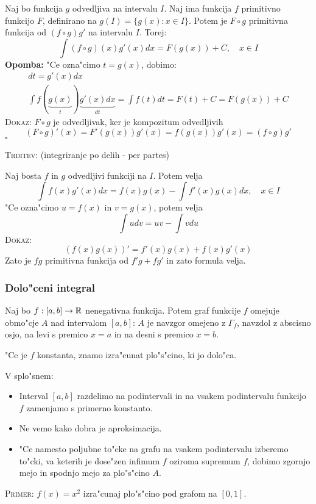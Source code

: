 Naj bo funkcija $g$ odvedljiva na intervalu $I$. Naj ima funkcija $f$ primitivno funkcijo $F$, definirano na $g(I) = \{g(x): x \in I\}$. Potem je $F \circ g$ primitivna funkcija od $(f\circ g) g'$ na intervalu $I$. Torej:
\begin{equation*}
\int (f\circ g)(x) g'(x) dx = F(g(x)) + C, \quad x \in I
\end{equation*}
\textbf{Opomba:} "Ce ozna"cimo $t = g(x)$, dobimo:
\begin{gather*}
dt = g'(x) dx \\
\int f(\underbrace{g(x)}_t) \underbrace{g'(x)dx}_{dt} = \int f(t) dt = F(t) + C = F(g(x)) + C
\end{gather*}
\textsc{Dokaz:} $F \circ g$ je odvedljivak, ker je  kompozitum odvedljivih
\begin{equation*}
(F \circ g)' (x) = F'(g(x)) g'(x) = f(g(x)) g'(x) = (f \circ g) g'
\end{equation*}
\hfill $\square$

\textsc{Trditev:} (integriranje po delih - per partes)

Naj bosta $f$ in $g$ odvedljivi funkciji na $I$. Potem velja
\begin{equation*}
\int f(x) g'(x) dx = f(x) g(x) - \int f'(x) g(x) dx, \quad x \in I
\end{equation*}
"Ce ozna"cimo $u = f(x)$ in $v = g(x)$, potem velja
\begin{equation*}
\int u dv = uv - \int v du
\end{equation*}
\textsc{Dokaz:}
\begin{equation*}
(f(x) g(x))' = f'(x) g(x) + f(x) g'(x)
\end{equation*}
Zato je $fg$ primitivna funkcija od $f'g + fg'$ in zato formula velja.
%
\subsubsection{Dolo"ceni integral}
Naj bo $f: [a, b] \to \mathbb{R}$ nenegativna funkcija. Potem graf funkcije $f$ omejuje obmo"cje $A$ nad intervalom $[a, b]$: $A$ je navzgor omejeno z $\Gamma_f$, navzdol z abscisno osjo, na levi s premico $x = a$ in na desni s premico $x = b$.

"Ce je $f$ konstanta, znamo izra"cunat plo"s"cino, ki jo dolo"ca.

V splo"snem:
\begin{itemize}
	\item Interval $[a, b]$ razdelimo na podintervali in na vsakem podintervalu funkcijo $f$ zamenjamo s primerno konstanto.
	\item Ne vemo kako dobra je aproksimacija.
	\item "Ce namesto poljubne to"cke na grafu na vsakem podintervalu izberemo to"cki, va keterih je dose"zen infimum $f$ oziroma supremum $f$, dobimo zgornjo mejo in spodnjo mejo za plo"s"cino $A$.
\end{itemize}
\textsc{Primer:} $f(x) = x^2$ izra"cunaj plo"s"cino pod grafom na $[0, 1]$.


